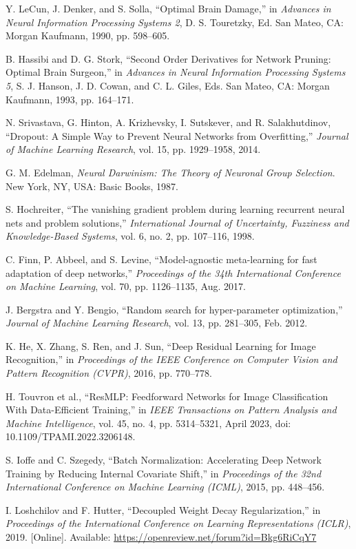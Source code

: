 \documentclass[conference]{IEEEtran}
\begin{document}
\begin{thebibliography}{00}

 Y. LeCun, J. Denker, and S. Solla, ``Optimal Brain Damage,'' in \textit{Advances in Neural Information Processing Systems 2}, D. S. Touretzky, Ed. San Mateo, CA: Morgan Kaufmann, 1990, pp. 598--605.

 B. Hassibi and D. G. Stork, ``Second Order Derivatives for Network Pruning: Optimal Brain Surgeon,'' in \textit{Advances in Neural Information Processing Systems 5}, S. J. Hanson, J. D. Cowan, and C. L. Giles, Eds. San Mateo, CA: Morgan Kaufmann, 1993, pp. 164--171.

 N. Srivastava, G. Hinton, A. Krizhevsky, I. Sutskever, and R. Salakhutdinov, ``Dropout: A Simple Way to Prevent Neural Networks from Overfitting,'' \textit{Journal of Machine Learning Research}, vol. 15, pp. 1929--1958, 2014.

 G. M. Edelman, \textit{Neural Darwinism: The Theory of Neuronal Group Selection}. New York, NY, USA: Basic Books, 1987.

 S. Hochreiter, ``The vanishing gradient problem during learning recurrent neural nets and problem solutions,'' \textit{International Journal of Uncertainty, Fuzziness and Knowledge-Based Systems}, vol. 6, no. 2, pp. 107--116, 1998.

 C. Finn, P. Abbeel, and S. Levine, ``Model-agnostic meta-learning for fast adaptation of deep networks,'' \textit{Proceedings of the 34th International Conference on Machine Learning}, vol. 70, pp. 1126--1135, Aug. 2017.

 J. Bergstra and Y. Bengio, ``Random search for hyper-parameter optimization,'' \textit{Journal of Machine Learning Research}, vol. 13, pp. 281--305, Feb. 2012.

 K. He, X. Zhang, S. Ren, and J. Sun, ``Deep Residual Learning for Image Recognition,'' in \textit{Proceedings of the IEEE Conference on Computer Vision and Pattern Recognition (CVPR)}, 2016, pp. 770--778.

 H. Touvron et al., ``ResMLP: Feedforward Networks for Image Classification With Data-Efficient Training,'' in \textit{IEEE Transactions on Pattern Analysis and Machine Intelligence}, vol. 45, no. 4, pp. 5314--5321, April 2023, doi: 10.1109/TPAMI.2022.3206148.

 S. Ioffe and C. Szegedy, ``Batch Normalization: Accelerating Deep Network Training by Reducing Internal Covariate Shift,'' in \textit{Proceedings of the 32nd International Conference on Machine Learning (ICML)}, 2015, pp. 448--456.

 I. Loshchilov and F. Hutter, ``Decoupled Weight Decay Regularization,'' in \textit{Proceedings of the International Conference on Learning Representations (ICLR)}, 2019. [Online]. Available: \url{https://openreview.net/forum?id=Bkg6RiCqY7}


\end{thebibliography}
\end{document}
